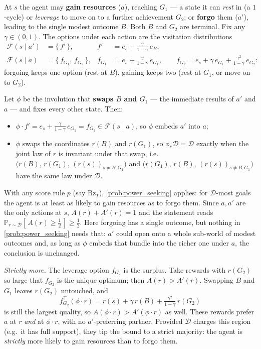 \documentclass[11pt]{article}
\newcommand{\Prob}{\mathbb{P}}
\newcommand{\Dist}{\mathcal{D}}    %
\newcommand{\F}{\mathcal{F}}       %
\begin{document}
\noindent At $s$ the agent may \textbf{gain resources} ($a$), reaching $G_1$ --- a state it can
\emph{rest} in (a $1$-cycle) or \emph{leverage} to move on to a further achievement $G_2$; or
\textbf{forgo} them ($a'$), leading to the single modest outcome $B$. Both $B$ and $G_2$ are
terminal. Fix any $\gamma \in (0,1)$. The options under each action are the visitation
distributions
\begin{align*}
\F(s\mid a') &= \{\, f' \,\}, & f' &= e_s + \tfrac{\gamma}{1-\gamma}\,e_B, \\[2pt]
\F(s\mid a) &= \{\, f_{G_1},\, f_{G_2} \,\}, & f_{G_1} &= e_s + \tfrac{\gamma}{1-\gamma}\,e_{G_1},
\qquad f_{G_2} = e_s + \gamma\,e_{G_1} + \tfrac{\gamma^2}{1-\gamma}\,e_{G_2}:
\end{align*}
forgoing keeps one option (rest at $B$), gaining keeps two (rest at $G_1$, or move on to $G_2$).

Let $\phi$ be the involution that \textbf{swaps $B$ and $G_1$} --- the immediate results of $a'$
and $a$ --- and fixes every other state. Then:
\begin{itemize}\itemsep=2pt
  \item[(E)] $\phi\cdot f' = e_s + \tfrac{\gamma}{1-\gamma}\,e_{G_1} = f_{G_1} \in \F(s\mid a)$, so
  $\phi$ embeds $a'$ into $a$;
  \item[(D)] $\phi$ swaps the coordinates $r(B)$ and $r(G_1)$, so $\phi_*\Dist = \Dist$ exactly when
  the joint law of $r$ is invariant under that swap, i.e.\
  $\bigl(r(B),\,r(G_1),\,(r(s))_{s\ne B,G_1}\bigr)$ and
  $\bigl(r(G_1),\,r(B),\,(r(s))_{s\ne B,G_1}\bigr)$ have the same law under $\Dist$.
\end{itemize}
With any score rule $p$ (say $\mathrm{Bz}_T$), \cref{prob:power_seeking} applies: for $\Dist$-most
goals the agent is at least as likely to gain resources as to forgo them. Since $a, a'$ are the only
actions at $s$, $A(r) + A'(r) = 1$ and the statement reads
$\Prob_{r\sim\Dist}[\,A(r) \ge \tfrac12\,] \ge \tfrac12$. Here forgoing has a single outcome, but
nothing in \cref{prob:power_seeking} needs that: $a'$ could open onto a whole sub-world of modest
outcomes and, as long as $\phi$ embeds that bundle into the richer one under $a$, the conclusion is
unchanged.

\emph{Strictly more.} The leverage option $f_{G_2}$ is the surplus. Take rewards with $r(G_2)$ so
large that $f_{G_2}$ is the unique optimum; then $A(r) > A'(r)$. Swapping $B$ and $G_1$ leaves
$r(G_2)$ untouched, and
$$
f_{G_2}^\top(\phi\cdot r) = r(s) + \gamma\,r(B) + \tfrac{\gamma^2}{1-\gamma}\,r(G_2)
$$
is still the largest quality, so $A(\phi\cdot r) > A'(\phi\cdot r)$ as well. These rewards prefer
$a$ at $r$ \emph{and} at $\phi\cdot r$, with no $a'$-preferring partner.
Provided $\Dist$ charges this region (e.g.\ it has full support), they tip the bound to a strict
majority: the agent is \emph{strictly} more likely to gain resources than to forgo them.
\end{document}
